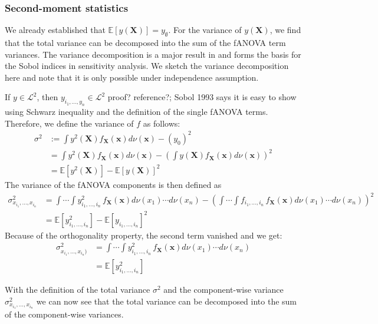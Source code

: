 \subsubsection*{Second-moment statistics}
We already established that $\mathbb{E}[y(\boldsymbol{X})] = y_{\emptyset}$.
For the variance of $y(\boldsymbol{X})$, we find that the total variance can be decomposed into the sum of the fANOVA term variances. The variance decomposition is a major result in \cite{sobol1993sensitivity} and forms the basis for the Sobol indices in sensitivity analysis. We sketch the variance decomposition here and note that it is only possible under independence assumption.\par
If $y \in \mathcal{L}^2$, then $y_{i_{1}, \dots, y_{n}} \in \mathcal{L}^2$ {\color{blue}proof? reference?; Sobol 1993 says it is easy to show using Schwarz inequality and the definition of the single fANOVA terms.}
Therefore, we define the variance of $f$ as follows:
\begin{align*}
    \sigma^2 &:= \int y^2(\boldsymbol{X}) f_{\boldsymbol{X}}(\boldsymbol{x}) d\nu (\boldsymbol{x}) - (y_0)^2 \\
    &= \int y^2(\boldsymbol{X}) f_{\boldsymbol{X}}(\boldsymbol{x}) d\nu (\boldsymbol{x}) - (\int y(\boldsymbol{X}) f_{\boldsymbol{X}}(\boldsymbol{x}) d\nu (\boldsymbol{x}))^2 \\
    &= \mathbb{E}[y^2(\boldsymbol{X})] - \mathbb{E}[y(\boldsymbol{X})]^2
    \label{variance_whole}
\end{align*}
The variance of the fANOVA components is then defined as
\begin{align*}
    \sigma^2_{x_{i_1}, \dots, x_{i_n}}
    &= \int \cdots \int y^2_{i_{1}, \dots, i_{n}} \, f_{\boldsymbol{X}}(\boldsymbol{x}) d\nu(x_1) \cdots d\nu(x_n) - \left( \int \cdots \int f_{i_{1}, \dots, i_{n}} \, f_{\boldsymbol{X}}(\boldsymbol{x}) d\nu(x_1) \cdots d\nu(x_n) \right)^2\\
    &= \mathbb{E}[y^2_{i_{1}, \dots, i_{n}}] - \mathbb{E}[y_{i_{1}, \dots, i_{n}}]^2
\end{align*}
Because of the orthogonality property, the second term vanished and we get:
\begin{align*}
    \sigma^2_{x_{i_1}, \dots, x_{i_n})}
    &= \int \cdots \int y^2_{i_{1}, \dots, i_{n}} \, f_{\boldsymbol{X}}(\boldsymbol{x}) d\nu(x_1) \cdots d\nu(x_n)\\
    &= \mathbb{E}[y^2_{i_{1}, \dots, i_{n}}]
\end{align*}

With the definition of the total variance $\sigma^2$ and the component-wise variance $\sigma^2_{x_{i_1}, \dots, x_{i_n}}$ we can now see that the total variance can be decomposed into the sum of the component-wise variances.

